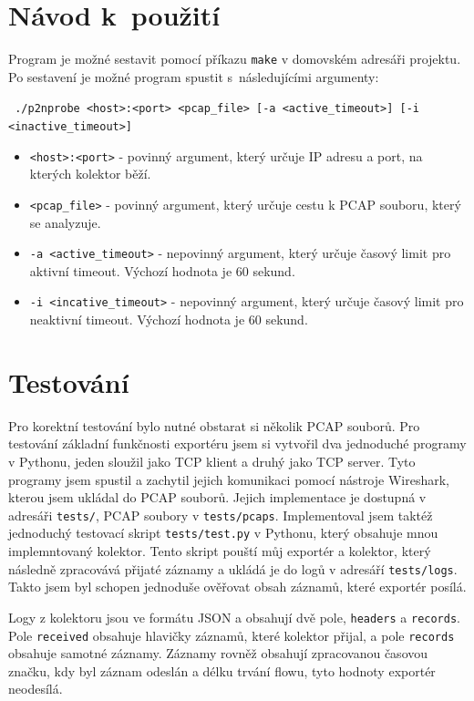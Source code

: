 \documentclass[a4paper, 11pt]{article}
\begin{document}
\begin{sloppypar}
\section{Návod k~použití}

Program je možné sestavit pomocí příkazu \texttt{make} v domovském adresáři projektu. Po sestavení je možné program spustit s~následujícími argumenty:

\vspace{0.1cm}
\texttt{
    ./p2nprobe <host>:<port> <pcap\_file> [-a <active\_timeout>] 
            [-i <inactive\_timeout>]
}

\begin{itemize}
    \item \texttt{<host>:<port>} - povinný argument, který určuje IP adresu a port, na kterých kolektor běží.
    \item \texttt{<pcap\_file>} - povinný argument, který určuje cestu k PCAP souboru, který se analyzuje.
    \item \texttt{-a <active\_timeout>} - nepovinný argument, který určuje časový limit pro aktivní timeout. Výchozí hodnota je 60 sekund.
    \item \texttt{-i <incative\_timeout>} - nepovinný argument, který určuje časový limit pro neaktivní timeout. Výchozí hodnota je 60 sekund.
\end{itemize}

\section{Testování}
Pro korektní testování bylo nutné obstarat si několik PCAP souborů. Pro testování základní funkčnosti exportéru jsem si vytvořil dva jednoduché programy v Pythonu, jeden sloužil jako TCP klient a druhý jako TCP server. Tyto programy jsem spustil a zachytil jejich komunikaci pomocí nástroje Wireshark, kterou jsem ukládal do PCAP souborů. Jejich implementace je dostupná v adresáři \texttt{tests/}, PCAP soubory v \texttt{tests/pcaps}. Implementoval jsem taktéž jednoduchý testovací skript \texttt{tests/test.py} v Pythonu, který obsahuje mnou implemntovaný kolektor. Tento skript pouští můj exportér a kolektor, který následně zpracovává přijaté záznamy a ukládá je do logů v adresáří \texttt{tests/logs}. Takto jsem byl schopen jednoduše ověřovat obsah záznamů, které exportér posílá.

Logy z kolektoru jsou ve formátu JSON a obsahují dvě pole, \texttt{headers} a \texttt{records}. Pole \texttt{received} obsahuje hlavičky záznamů, které kolektor přijal, a pole \texttt{records} obsahuje samotné záznamy. Záznamy rovněž obsahují zpracovanou časovou značku, kdy byl záznam odeslán a délku trvání flowu, tyto hodnoty exportér neodesílá.


\end{sloppypar}
\end{document}
